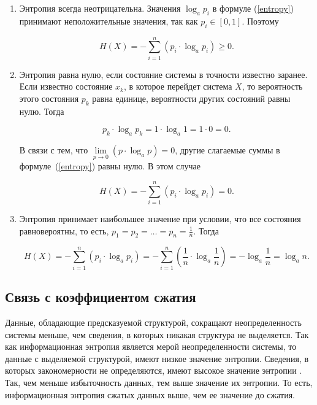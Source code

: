 \begin{enumerate}
	\item Энтропия всегда неотрицательна. Значения $\log_{a} p_{i}$ в формуле (\ref{entropy}) принимают неположительные значения, так как $p_{i} \in [0, 1]$. Поэтому
	
\begin{equation}
	H(X) = -\sum_{i = 1}^n (p_{i} \cdot \log_{a} p_{i}) \geqslant 0.
\end{equation}

	\item\label{property2} Энтропия равна нулю, если состояние системы в точности известно заранее. Если известно состояние $x_{k}$, в которое перейдет система $X$, то вероятность этого состояния $p_{k}$ равна единице, вероятности других состояний равны нулю. Тогда
	
\begin{equation}
	p_{k} \cdot \log_{a} p_{k} = 1 \cdot \log_{a} 1 = 1 \cdot 0 = 0.
\end{equation}

В связи с тем, что $\lim\limits_{p \to 0} (p \cdot \log_{a}p) = 0$, другие слагаемые суммы в формуле~(\ref{entropy}) равны нулю. В этом случае 

\begin{equation}
	H(X) = -\sum_{i = 1}^n (p_{i} \cdot \log_{a} p_{i}) = 0.
\end{equation}

	\item\label{property3} Энтропия принимает наибольшее значение при условии, что все состояния равновероятны, то есть, $p_{1} = p_{2} = \dots = p_{n} = \frac{1}{n}$. Тогда
	
\begin{equation}
	H(X) = -\sum_{i = 1}^n (p_{i} \cdot \log_{a} p_{i}) = -\sum_{i = 1}^n (\frac{1}{n} \cdot \log_{a} \frac{1}{n}) = -\log_{a} \frac{1}{n} = \log_{a} n.
\end{equation}
	
\end{enumerate}

\subsection{Связь с коэффициентом сжатия}\label{relation}

Данные, обладающие предсказуемой структурой, сокращают неопределенность системы меньше, чем сведения, в которых никакая структура не выделяется. Так как информационная энтропия является мерой неопределенности системы, то данные с выделяемой структурой, имеют низкое значение энтропии. Сведения, в которых закономерности не определяются, имеют высокое значение энтропии \cite{relation}. Так, чем меньше избыточность данных, тем выше значение их энтропии. То есть, информационная энтропия сжатых данных выше, чем ее значение до сжатия.

